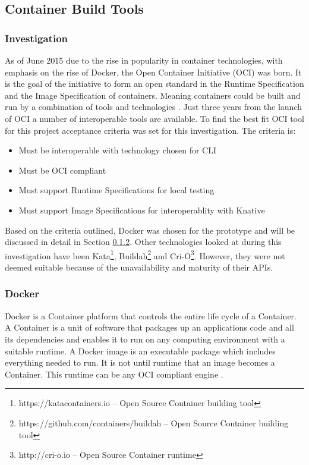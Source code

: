 \subsection{Container Build Tools}
\subsubsection{Investigation}
\label{sub:build_invest}
As of June 2015 due to the rise in popularity in container technologies, with emphasis on the rise of \gls{Docker}, the Open Container Initiative (\gls{OCI}) was born. It is the goal of the initiative to form an open standard in the Runtime Specification and the Image Specification of containers. Meaning containers could be built and run by a combination of tools and technologies \citep{oci}. 
Just three years from the launch of \gls{OCI} a number of interoperable tools are available. To find the best fit \gls{OCI} tool for this project acceptance criteria was set for this investigation. The criteria is: 
\begin{itemize}
    \item Must be interoperable with technology chosen for \gls{CLI}
    \item Must be OCI compliant
    \item Must support Runtime Specifications for local testing
    \item Must support Image Specifications for interoperablity with \gls{Knative}
\end{itemize}
Based on the criteria outlined, \gls{Docker} was chosen for the prototype and will be discussed in detail in Section \ref{sub:docker}. Other technologies looked at during this investigation have been \gls{Kata}\footnote{https://katacontainers.io -- Open Source Container building tool}, \gls{Buildah}\footnote{https://github.com/containers/buildah -- Open Source Container building tool} and \gls{Cri-O}\footnote{http://cri-o.io -- Open Source Container runtime}. However, they were not deemed suitable because of the unavailability and maturity of their \gls{API}s.

\subsubsection{Docker}
\label{sub:docker}
\gls{Docker} is a \gls{Container} platform that controls the entire life cycle of a \gls{Container}. A \gls{Container} is a unit of software that packages up an applications code and all its dependencies and enables it to run on any computing environment with a suitable runtime. A \gls{Docker} image is an executable package which includes everything needed to run. It is not until runtime that an image becomes a \gls{Container}. This runtime can be any \gls{OCI} compliant engine \citep{docker}.

